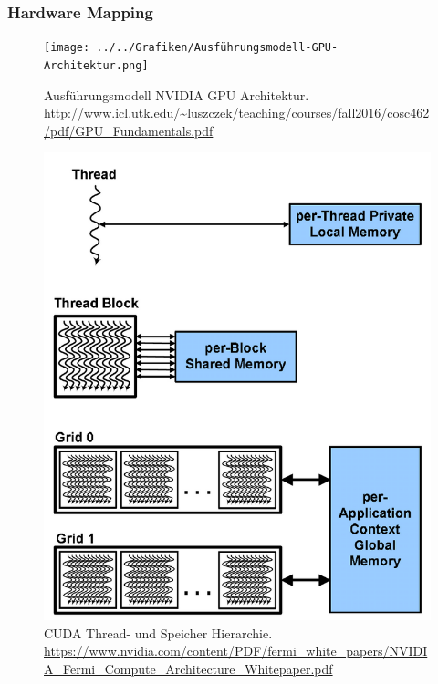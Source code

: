 \subsubsection*{Hardware Mapping}
\begin{figure}[]
	\centering
	\begin{minipage}[b]{0.49\textwidth}
		\centering
		\texttt{[image: ../../Grafiken/Ausführungsmodell-GPU-Architektur.png]}
		\caption{Ausführungsmodell NVIDIA GPU Architektur. \url{http://www.icl.utk.edu/~luszczek/teaching/courses/fall2016/cosc462/pdf/GPU_Fundamentals.pdf}}
		\label{fig::ga04}
	\end{minipage}
	\hfill
	\begin{minipage}[b]{0.49\textwidth}
		\centering
		\includegraphics[width=1\textwidth]{../../Grafiken/GPU-Memory-Hierarchie-with-Threads.PNG}
		\caption{CUDA Thread- und Speicher Hierarchie. \url{https://www.nvidia.com/content/PDF/fermi_white_papers/NVIDIA_Fermi_Compute_Architecture_Whitepaper.pdf}}
		\label{fig::ga05}
	\end{minipage}
\end{figure}

